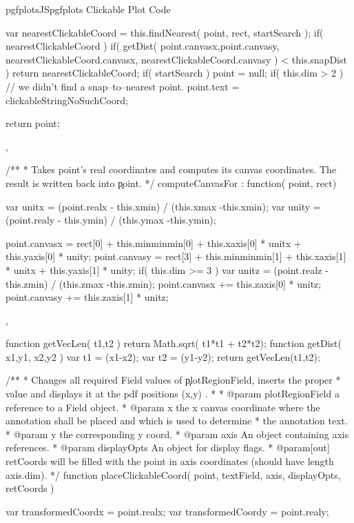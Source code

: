 {{\begin{insDLJS}[processAnnotatedPlot]{pgfplotsJS}{pgfplots Clickable Plot Code}
{{		var nearestClickableCoord = this.findNearest( point, rect, startSearch );
		if( nearestClickableCoord ) {
			if( getDist( point.canvasx,point.canvasy,  nearestClickableCoord.canvasx, nearestClickableCoord.canvasy ) < this.snapDist ) {
				return nearestClickableCoord;
			}
		}
		if( startSearch )
			point = null;
		if( this.dim > 2 ) { // we didn't find a snap--to--nearest point.
			point.text = clickableStringNoSuchCoord;
		}

		return point;
	},

	/**
	 * Takes point's real coordinates and computes its canvas coordinates. The result is written back into \c point.
	 */
	computeCanvasFor : function( point, rect)
	{
		var unitx = (point.realx - this.xmin) / (this.xmax -this.xmin);
		var unity = (point.realy - this.ymin) / (this.ymax -this.ymin);

		point.canvasx = rect[0] + this.minminmin[0] + this.xaxis[0] * unitx + this.yaxis[0] * unity;
		point.canvasy = rect[3] + this.minminmin[1] + this.xaxis[1] * unitx + this.yaxis[1] * unity;
		if( this.dim >= 3 ) {
			var unitz = (point.realz - this.zmin) / (this.zmax -this.zmin);
			point.canvasx += this.zaxis[0] * unitz;
			point.canvasy += this.zaxis[1] * unitz;
		}
	},
}



function getVecLen( t1,t2 ) {
	return Math.sqrt( t1*t1 + t2*t2);
}
function getDist( x1,y1, x2,y2 ) {
	var t1 = (x1-x2);
	var t2 = (y1-y2);
	return getVecLen(t1,t2);
}

/**
 * Changes all required Field values of \c plotRegionField, inserts the proper
 * value and displays it at the pdf positions (x,y) .
 *
 * @param plotRegionField a reference to a Field object.
 * @param x the x canvas coordinate where the annotation shall be placed and which is used to determine
 *  the annotation text.
 * @param y the corresponding y coord.
 * @param axis An object containing axis references.
 * @param displayOpts An object for display flags.
 * @param[out] retCoords will be filled with the point in axis coordinates (should have length axis.dim).
 */
function placeClickableCoord( point, textField, axis, displayOpts, retCoords )
{

	var transformedCoordx = point.realx;
	var transformedCoordy = point.realy;

}
\end{insDLJS}}}
